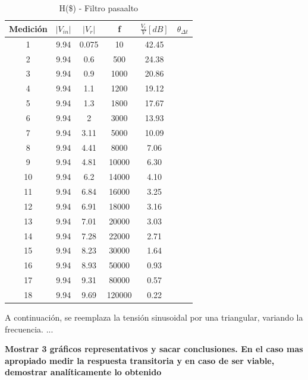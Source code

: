 \documentclass[a4paper]{article}
\begin{document}
 \begin{center}
     \begin{table}[H]
     \centering
	   \renewcommand{\arraystretch}{1.1}
     \label{table:Filtro pasaalto}
         \begin{tabular}{c c c c c c }
            \hline 
             Medici\'on  & $|V_{in}|$ &    $|V_r|$ & f&  $\frac{V_r}{V}[dB]$ & $\theta_{\Delta t}$  \\
             \hline
                1	&9.94&	0.075	&10	    &42.45 & \\
                2	&9.94&	0.6	    &500	&24.38 & \\
                3	&9.94&	0.9	    &1000	&20.86 & \\
                4	&9.94&	1.1	    &1200	&19.12 & \\
                5	&9.94&	1.3 	&1800	&17.67 & \\
                6	&9.94&	2	    &3000	&13.93\\
                7	&9.94&	3.11	&5000	&10.09\\
                8	&9.94&	4.41	&8000	&7.06\\
                9	&9.94&	4.81	&10000	&6.30\\
                10	&9.94&	6.2	    &14000	&4.10\\
                11	&9.94&	6.84	&16000	&3.25\\
                12	&9.94&	6.91	&18000	&3.16\\
                13	&9.94&	7.01	&20000	&3.03\\
                14	&9.94&	7.28	&22000	&2.71\\
                15	&9.94&	8.23	&30000	&1.64\\
                16	&9.94&	8.93	&50000	&0.93\\
                17	&9.94&	9.31	&80000	&0.57\\
                18	&9.94&	9.69	&120000	&0.22\\

 \hline
        \end{tabular}
        \caption{H(\$) - Filtro pasaalto}
    \end{table}
\end{center}


A continuación, se reemplaza la tensión sinusoidal por una triangular, variando la frecuencia. ...

\textbf{Mostrar 3 gráficos representativos y sacar conclusiones. En el caso mas apropiado medir la respuesta transitoria y en caso de ser viable, demostrar analíticamente lo obtenido}
\end{document}

